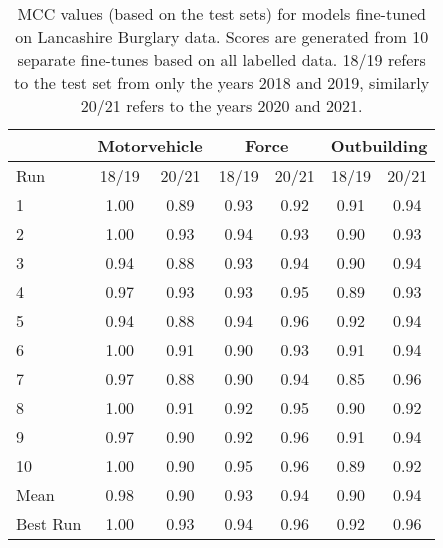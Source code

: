 \begin{table}[]
\centering
\begin{tabular}{@{}lcccccc@{}}
\toprule
         & \multicolumn{2}{c}{Motorvehicle} & \multicolumn{2}{c}{Force} & \multicolumn{2}{c}{Outbuilding} \\ \midrule
Run      & 18/19           & 20/21          & 18/19       & 20/21       & 18/19          & 20/21          \\
1        & 1.00            & 0.89           & 0.93        & 0.92        & 0.91           & 0.94           \\
2        & 1.00            & 0.93           & 0.94        & 0.93        & 0.90           & 0.93           \\
3        & 0.94            & 0.88           & 0.93        & 0.94        & 0.90           & 0.94           \\
4        & 0.97            & 0.93           & 0.93        & 0.95        & 0.89           & 0.93           \\
5        & 0.94            & 0.88           & 0.94        & 0.96        & 0.92           & 0.94           \\
6        & 1.00            & 0.91           & 0.90        & 0.93        & 0.91           & 0.94           \\
7        & 0.97            & 0.88           & 0.90        & 0.94        & 0.85           & 0.96           \\
8        & 1.00            & 0.91           & 0.92        & 0.95        & 0.90           & 0.92           \\
9        & 0.97            & 0.90           & 0.92        & 0.96        & 0.91           & 0.94           \\
10       & 1.00            & 0.90           & 0.95        & 0.96        & 0.89           & 0.92           \\\midrule
Mean     & 0.98            & 0.90           & 0.93        & 0.94        & 0.90           & 0.94           \\\midrule
Best Run & 1.00            & 0.93           & 0.94        & 0.96        & 0.92           & 0.96           \\ \bottomrule
\end{tabular}
\caption{\label{tab:lancs_mcc}MCC values (based on the test sets) for models fine-tuned on Lancashire Burglary data. Scores are generated from 10 separate fine-tunes based on all labelled data. 18/19 refers to the test set from only the years 2018 and 2019, similarly 20/21 refers to the years 2020 and 2021.}
\end{table}




